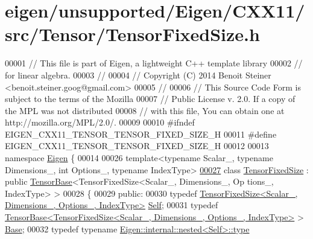 \hypertarget{eigen_2unsupported_2_eigen_2_c_x_x11_2src_2_tensor_2_tensor_fixed_size_8h_source}{}\section{eigen/unsupported/\+Eigen/\+C\+X\+X11/src/\+Tensor/\+Tensor\+Fixed\+Size.h}
\label{eigen_2unsupported_2_eigen_2_c_x_x11_2src_2_tensor_2_tensor_fixed_size_8h_source}

\begin{DoxyCode}
00001 \textcolor{comment}{// This file is part of Eigen, a lightweight C++ template library}
00002 \textcolor{comment}{// for linear algebra.}
00003 \textcolor{comment}{//}
00004 \textcolor{comment}{// Copyright (C) 2014 Benoit Steiner <benoit.steiner.goog@gmail.com>}
00005 \textcolor{comment}{//}
00006 \textcolor{comment}{// This Source Code Form is subject to the terms of the Mozilla}
00007 \textcolor{comment}{// Public License v. 2.0. If a copy of the MPL was not distributed}
00008 \textcolor{comment}{// with this file, You can obtain one at http://mozilla.org/MPL/2.0/.}
00009 
00010 \textcolor{preprocessor}{#ifndef EIGEN\_CXX11\_TENSOR\_TENSOR\_FIXED\_SIZE\_H}
00011 \textcolor{preprocessor}{#define EIGEN\_CXX11\_TENSOR\_TENSOR\_FIXED\_SIZE\_H}
00012 
00013 \textcolor{keyword}{namespace }\hyperlink{namespace_eigen}{Eigen} \{
00014 
00026 \textcolor{keyword}{template}<\textcolor{keyword}{typename} Scalar\_, \textcolor{keyword}{typename} Dimensions\_, \textcolor{keywordtype}{int} Options\_, \textcolor{keyword}{typename} IndexType>
\hyperlink{class_eigen_1_1_tensor_fixed_size}{00027} \textcolor{keyword}{class }\hyperlink{class_eigen_1_1_tensor_fixed_size}{TensorFixedSize} : \textcolor{keyword}{public} \hyperlink{class_eigen_1_1_tensor_base}{TensorBase}<TensorFixedSize<Scalar\_, Dimensions\_, Op
      tions\_, IndexType> >
00028 \{
00029   \textcolor{keyword}{public}:
00030     \textcolor{keyword}{typedef} \hyperlink{class_eigen_1_1_tensor_fixed_size}{TensorFixedSize<Scalar\_, Dimensions\_, Options\_, IndexType>}
       \hyperlink{class_eigen_1_1_tensor_fixed_size}{Self};
00031     \textcolor{keyword}{typedef} 
      \hyperlink{class_eigen_1_1_tensor_base}{TensorBase<TensorFixedSize<Scalar\_, Dimensions\_, Options\_, IndexType>}
       > \hyperlink{class_eigen_1_1_tensor_base}{Base};
00032     \textcolor{keyword}{typedef} \textcolor{keyword}{typename} \hyperlink{class_eigen_1_1internal_1_1_tensor_lazy_evaluator_writable}{Eigen::internal::nested<Self>::type} 

\end{DoxyCode}
